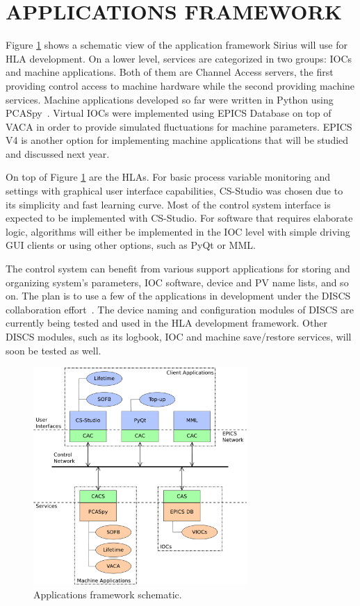 \documentclass[a4paper,
              ]{jacow}
\begin{document}
\section{APPLICATIONS FRAMEWORK}
Figure \ref{fig:f1} shows a schematic view of the application framework Sirius will use for HLA development. On a lower level, services are categorized in two groups: IOCs and machine applications. Both of them are Channel Access servers, the first providing control access to machine hardware while the second providing machine services. Machine applications developed so far were written in Python using PCASpy~\cite{pcaspy}. Virtual IOCs were implemented using EPICS Database on top of VACA in order to provide simulated fluctuations for machine parameters. EPICS V4 is another option for implementing machine applications that will be studied and discussed next year.

On top of Figure \ref{fig:f1} are the HLAs. For basic process variable monitoring and settings with graphical user interface capabilities, CS-Studio was chosen due to its simplicity and fast learning curve. Most of the control system interface is expected to be implemented with CS-Studio. For software that requires elaborate logic, algorithms will either be implemented in the IOC level with simple driving GUI clients or using other options, such as PyQt or MML.

The control system can benefit from various support applications for storing and organizing system's parameters, IOC software, device and PV name lists, and so on. The plan is to use a few of the applications in development under the DISCS collaboration effort~\cite{discs_article,discs_openepics}. The device naming and configuration modules of DISCS are currently being tested and used in the HLA development framework. Other DISCS modules, such as its logbook, IOC  and machine save/restore services, will soon be tested as well.

\begin{figure}[!htb]
   \centering
   \includegraphics*[width=230pt]{WEPOPRPO22f1}
   \caption{Applications framework schematic.}
   \label{fig:f1}
\end{figure}
\end{document}
